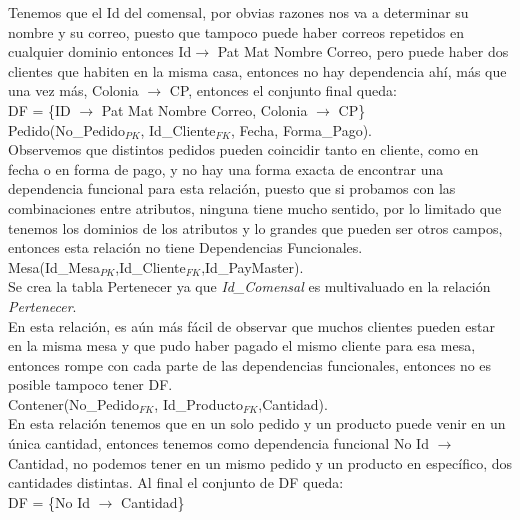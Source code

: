 \documentclass[11pt,letterpaper]{article}
\begin{document}
Tenemos que el Id del comensal, por obvias razones nos va a determinar su nombre y su correo, puesto que tampoco puede haber correos repetidos en cualquier dominio entonces Id\(\rightarrow\) Pat Mat Nombre Correo, pero puede haber dos clientes que habiten en la misma casa, entonces no hay dependencia ahí, más que una vez más, Colonia \(\rightarrow\) CP, entonces el conjunto final queda:\\

DF = \{ID \(\rightarrow\) Pat Mat Nombre Correo, Colonia \(\rightarrow\) CP\}\\

Pedido(No\_Pedido\(_{PK}\), Id\_Cliente\(_{FK}\), Fecha, Forma\_Pago).\\

Observemos que distintos pedidos pueden coincidir tanto en cliente, como en fecha o en forma de pago, y no hay una forma exacta de encontrar una dependencia funcional para esta relación, puesto que si probamos con las combinaciones entre atributos, ninguna tiene mucho sentido, por lo limitado que tenemos los dominios de los atributos y lo grandes que pueden ser otros campos, entonces esta relación no tiene Dependencias Funcionales.\\

Mesa(Id\_Mesa\(_{PK}\),Id\_Cliente\(_{FK}\),Id\_PayMaster).\\

Se crea la tabla Pertenecer ya que \textit{Id\_Comensal} es multivaluado en la relación \textit{Pertenecer}.\\

En esta relación, es aún más fácil de observar que muchos clientes pueden estar en la misma mesa y que pudo haber pagado el mismo cliente para esa mesa, entonces rompe con cada parte de las dependencias funcionales, entonces no es posible tampoco tener DF.\\

Contener(No\_Pedido\(_{FK}\), Id\_Producto\(_{FK}\),Cantidad).\\

En esta relación tenemos que en un solo pedido y un producto puede venir en un única cantidad, entonces tenemos como dependencia funcional No Id \(\rightarrow\) Cantidad, no podemos tener en un mismo pedido y un producto en específico, dos cantidades distintas. Al final el conjunto de DF queda:\\

DF = \{No Id \(\rightarrow\) Cantidad\}\\
\end{document}
